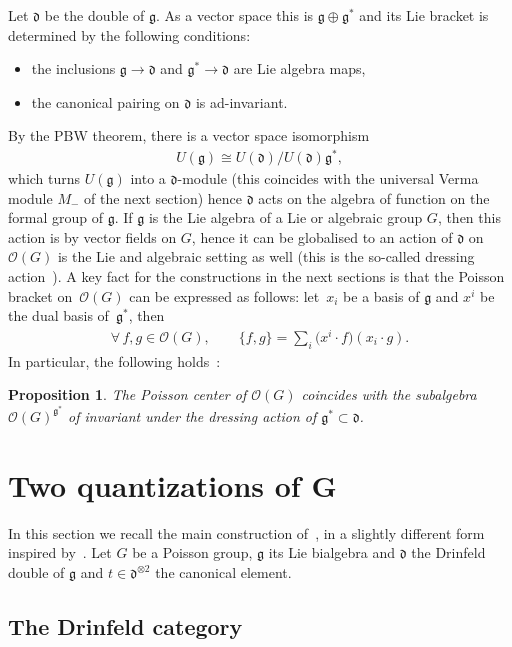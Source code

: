 \documentclass[pdftex]{sigma}
\numberwithin{equation}{section}
\newcommand{\mf}[1]{\mathfrak{#1}}
\newcommand{\ot}{\otimes}
\newcommand{\cO}{\mathcal O}
\newtheorem{prop}[thm]{Proposition}
\theoremstyle{definition}
\begin{document}
Let $\mf d$ be the double of $\mf g$. As a vector space this is $\mf g \oplus \mf g^*$ and its Lie bracket is determined by the following conditions:
\begin{itemize}\itemsep=0pt
	\item the inclusions $\mf g\rightarrow \mf d$ and $\mf g^* \rightarrow \mf d$ are Lie algebra maps,
	\item the canonical pairing on $\mf d$ is ad-invariant.
\end{itemize}

By the PBW theorem, there is a vector space isomorphism
\begin{gather*}
	U(\mf g)\cong U(\mf d)/U(\mf d)\mf g^*,
\end{gather*}
which turns $U(\mf g)$ into a $\mf d$-module (this coincides with the universal Verma module $M_-$ of the next section) hence $\mf d$ acts on the algebra of function on the formal group of $\mf g$. If $\mf g$ is the Lie algebra of a Lie or algebraic group $G$, then this action is by vector f\/ields on $G$, hence it can be globalised to an action of $\mf d$ on $\cO(G)$ is the Lie and algebraic setting as well (this is the so-called dressing action~\cite{Semenov-Tian-Shansky1985}). A key fact for the constructions in the next sections is that the Poisson bracket on~$\cO(G)$ can be expressed as follows: let~$x_i$ be a basis of $\mf g$ and $x^i$ be the dual basis of~$\mf g^*$, then
\begin{gather*}
	\forall\, f,g \in \cO(G),\qquad \{f,g\}=\sum_i \big(x^i\cdot f\big)(x_i\cdot g).
\end{gather*}
In particular, the following holds~\cite{Semenov-Tian-Shansky1985}:
\begin{prop}\label{prop:dressing}
The Poisson center of $\cO(G)$ coincides with the subalgebra $\cO(G)^{\mf g^*}$ of invariant under the dressing action of $\mf g^* \subset \mf d$.
\end{prop}

\section[Two quantizations of $G$]{Two quantizations of $\boldsymbol{G}$}
In this section we recall the main construction of~\cite{Etingof1996}, in a slightly dif\/ferent form inspired by~\cite{Severa2016}. Let $G$ be a Poisson group, $\mf g$ its Lie bialgebra and $\mf d$ the Drinfeld double of $\mf g$ and $t \in \mf d^{\ot 2}$ the canonical element.

\subsection{The Drinfeld category}
\end{document}
